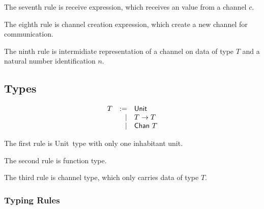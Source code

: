 \documentclass{article}
\newcommand{\sco}[1]{\textsf{#1}}
\newcommand{\unit}{\sco{unit}}
\newcommand{\Unit}{\sco{Unit}}
\newcommand{\Chan}[1]{\sco{Chan }#1}
\begin{document}
The seventh rule is receive expression, which receives an value from a channel $c$.

The eighth rule is channel creation expression, which create a new channel for communication.

The ninth rule is intermidiate representation of a channel on data of type $T$ and
a natural number identification $n$.

\subsection{Types}

\begin{gather*}
    \begin{array}[]{rrl}
        T & := & \Unit  \\
          &  | & T -> T \\
          &  | & \Chan{T}
    \end{array}
\end{gather*}

The first rule is \Unit\ type with only one inhabitant \unit.

The second rule is function type.

The third rule is channel type, which only carries data of type $T$.

\subsubsection{Typing Rules}
\end{document}
